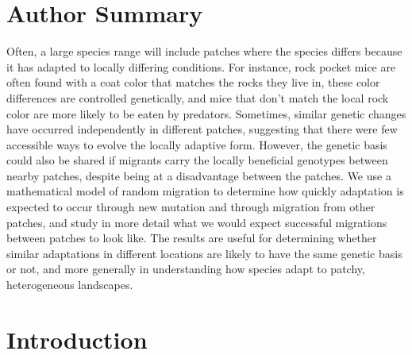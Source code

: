 \documentclass{article}
\newcommand{\citep}[1]{\cite{#1}}
\begin{document}
\section*{Author Summary}
Often, a large species range will include patches where the species differs because it has adapted to locally differing conditions.
For instance, rock pocket mice are often found with a coat color that matches the rocks they live in,
these color differences are controlled genetically,
and mice that don't match the local rock color are more likely to be eaten by predators.
Sometimes, similar genetic changes have occurred independently in different patches,
suggesting that there were few accessible ways to evolve the locally adaptive form.
However, the genetic basis could also be shared if
migrants carry the locally beneficial genotypes between nearby patches,
despite being at a disadvantage between the patches.
We use a mathematical model of random migration to determine how quickly adaptation is expected to occur 
through new mutation and through migration from other patches,
and study in more detail what we would expect successful migrations between patches to look like.
The results are useful for determining whether similar adaptations in different locations are likely to have the same genetic basis or not,
and more generally in understanding how species adapt to patchy, heterogeneous landscapes.




\section*{Introduction}

\end{document}
